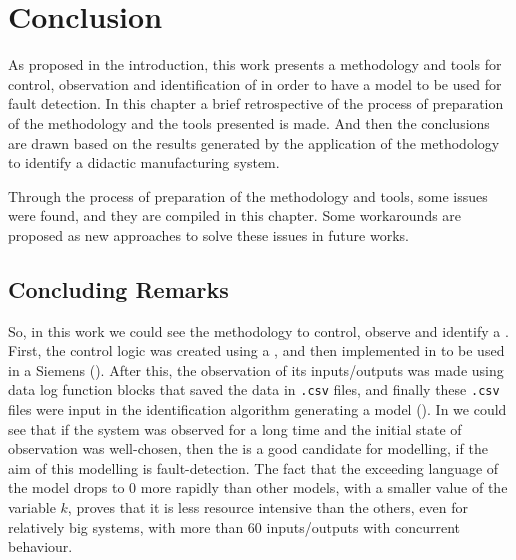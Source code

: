 \chapter{Conclusion}
\label{cha:conclusion}
As proposed in the introduction, this work presents a methodology and tools for
control, observation and identification of \DESs{} in order to have a model to be
used for fault detection. In this chapter a brief retrospective of the process
of preparation of the methodology and the tools presented is made. And then the
conclusions are drawn based on the results generated by the application of
the methodology
to identify a didactic manufacturing system.

Through the process of preparation of the methodology and tools, some issues
were found, and they are compiled in this chapter. Some
workarounds are proposed as new approaches to solve these issues in future works.

\section{Concluding Remarks}
\label{sec:concludingRemarks}
So, in this work we could see the methodology to control, observe and identify a
\DES{}. First, the control logic was created using a \CIPN, and then implemented
in \LD{} to be used in a Siemens \PLC{} (). After this, the observation of its
inputs\slash outputs was made using data log function blocks that saved the data in
\verb|.csv| files, and finally these \verb|.csv| files were input in the
identification algorithm generating a \DAOCT{} model (). In
 we could see that if the system was observed for a long
time and the initial state of observation was well-chosen, then the \DAOCT{} is
a good candidate for modelling, if the aim of this modelling is fault-detection.
The fact that the exceeding language of the \DAOCT{} model drops to $0$ more
rapidly than other models, with a smaller value of the variable $k$, proves that it is less resource intensive than the
others, even for relatively big
systems, with more than $60$ inputs\slash outputs with concurrent behaviour.


